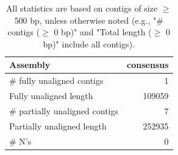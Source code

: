 \documentclass[12pt,a4paper]{article}
\begin{document}
\begin{table}[ht]
\begin{center}
\caption{All statistics are based on contigs of size $\geq$ 500 bp, unless otherwise noted (e.g., "\# contigs ($\geq$ 0 bp)" and "Total length ($\geq$ 0 bp)" include all contigs).}
\begin{tabular}{|l*{1}{|r}|}
\hline
Assembly & consensus \\ \hline
\# fully unaligned contigs & 1 \\ \hline
Fully unaligned length & 109059 \\ \hline
\# partially unaligned contigs & 7 \\ \hline
Partially unaligned length & 252935 \\ \hline
\# N's & 0 \\ \hline
\end{tabular}
\end{center}
\end{table}
\end{document}
